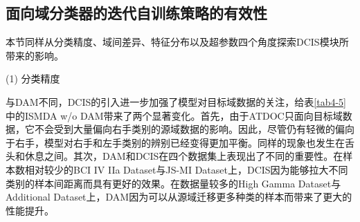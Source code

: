 \begin{table}[!h]
\caption{DAM中静态矩阵数$K$对于分类精度（\%）的影响\label{tab4-6}}
\centering
{}
\end{table}


\subsection{面向域分类器的迭代自训练策略的有效性}
本节同样从分类精度、域间差异、特征分布以及超参数四个角度探索DCIS模块所带来的影响。

(1) 分类精度

与DAM不同，DCIS的引入进一步加强了模型对目标域数据的关注，给表\ref{tab4-5}中的ISMDA w/o DAM带来了两个显著变化。首先，由于ATDOC只面向目标域数据，它不会受到大量偏向右手类别的源域数据的影响。因此，尽管仍有轻微的偏向于右手，模型对右手和左手类别的辨别已经变得更加平衡。同样的现象也发生在舌头和休息之间。其次，DAM和DCIS在四个数据集上表现出了不同的重要性。在样本数相对较少的BCI IV IIa Dataset与JS-MI Dataset上，DCIS因为能够拉大不同类别的样本间距离而具有更好的效果。在数据量较多的High Gamma Dataset与Additional Dataset上，DAM因为可以从源域迁移更多种类的样本而带来了更大的性能提升。

